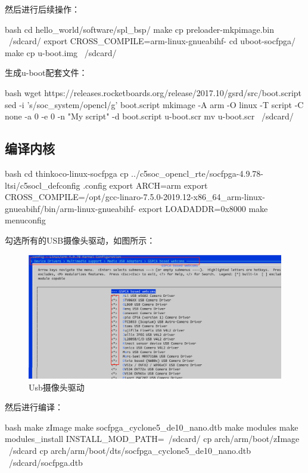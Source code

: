 然后进行后续操作：
\begin{code-block}{bash}
cd hello_world/software/spl_bsp/
make
cp preloader-mkpimage.bin ~/sdcard/
export CROSS_COMPILE=arm-linux-gnueabihf-
cd uboot-socfpga/
make
cp u-boot.img ~/sdcard/
\end{code-block}

生成u-boot配套文件：
\begin{code-block}{bash}
wget https://releases.rocketboards.org/release/2017.10/gsrd/src/boot.script
sed -i 's/soc_system/opencl/g' boot.script
mkimage   -A arm -O linux -T script -C none -a 0 -e 0 -n "My script" -d boot.script u-boot.scr
mv u-boot.scr ~/sdcard/
\end{code-block}

\subsection{编译内核}
\begin{code-block}{bash}
cd thinkoco-linux-socfpga
cp ../c5soc_opencl_rte/socfpga-4.9.78-ltsi/c5socl_defconfig .config
export ARCH=arm
export CROSS_COMPILE=/opt/gcc-linaro-7.5.0-2019.12-x86_64_arm-linux-gnueabihf/bin/arm-linux-gnueabihf-
export LOADADDR=0x8000
make menuconfig
\end{code-block}

勾选所有的USB摄像头驱动，如图所示：
\begin{figure}[H]
  \centering
  \includegraphics[width=\linewidth]{usb_camera.png}
  \caption{Usb摄像头驱动}
  \label{fig:usb_camera}
\end{figure}

然后进行编译：
\begin{code-block}{bash}
make zImage
make socfpga_cyclone5_de10_nano.dtb
make modules
make modules_install INSTALL_MOD_PATH=~/sdcard/
cp arch/arm/boot/zImage ~/sdcard
cp arch/arm/boot/dts/socfpga_cyclone5_de10_nano.dtb  ~/sdcard/socfpga.dtb
\end{code-block}

